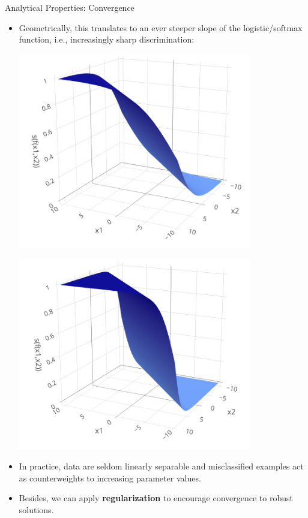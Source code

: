 \begin{vbframe}{Analytical Properties: Convergence}
\framebreak

\begin{itemize}
  \small
  \item
  Geometrically, this translates to an ever steeper slope of the 
  logistic/softmax function, i.e., increasingly sharp discrimination:
  
  \vspace{0.3cm}
  \begin{minipage}[b]{0.5\textwidth}
    \includegraphics[width=0.8\textwidth]{figure/softmax_1}
  \end{minipage}%
  \begin{minipage}[b]{0.5\textwidth}
    \includegraphics[width=0.8\textwidth]{figure/softmax_2}
  \end{minipage}%
  \item In practice, data are seldom linearly separable and misclassified 
  examples act as counterweights to increasing parameter values.
  \item Besides, we can apply \textbf{regularization} to encourage convergence 
  to robust solutions.
\end{itemize}

\end{vbframe}

